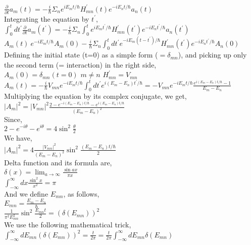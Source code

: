 \documentclass{article}
\begin{document}
\noindent $\frac{\partial}{\partial t}a_m(t)=-\frac{i}{\hbar}\Sigma_{n}e^{iE_mt/\hbar}H^{'}_{mn}(t)e^{-iE_nt/\hbar}a_n(t)$\\
\noindent Integrating the equation by $t^{'}$, \\
\noindent $\int^{t}_{0}dt^{'}\frac{\partial}{\partial t}a_m(t^{'})=-\frac{i}{\hbar}\Sigma_{n}\int^{t}_{0}e^{iE_mt^{'}/\hbar}H^{'}_{mn}(t^{'})e^{-iE_nt^{'}/\hbar}a_n(t^{'})$\\
\noindent $A_m(t)~e^{-iE_m t/\hbar}A_m(0)-\frac{i}{\hbar}\Sigma_n\int^{t}_{0}dt^{'}e^{-iE_m(t-t^{'})/\hbar}H^{'}_{mn}(t^{'})e^{-iE_n t^{'}/\hbar}A_n(0)$\\
\noindent Defining the initial state (t=0) as a simple form ($=\delta_{mn}$), and picking up only the second term (= interaction) in the right side,\\
\noindent $A_m(0)=\delta_{mn} (t=0)$ $m \neq n$ $H^{'}_{mn}=V_{mn}$\\
\noindent $A_m(t)=-\frac{i}{\hbar}V_{mn}e^{-iE_m t/\hbar}\int_0^{t}dt^{'}e^{i(E_m-E_n)t^{'}/\hbar}=-V_{mn}e^{-iE_m t/\hbar}\frac{e^{i(E_m-E_n)t/\hbar}-1}{E_m-E_n}$\\
\noindent Multiplying the equation by its complex conjugate, we get,\\
\noindent $\lvert A_m\rvert^2=\lvert V_{mn}\rvert^2\frac{2-e^{-i(E_m-E_n)t/\hbar}-e^{i(E_m-E_n)t/\hbar}}{(E_m-E_n)^2}$\\
\noindent Since,\\
\noindent $2-e^{-i\theta}-e^{i\theta}=4\sin^2\frac{\theta}{2}$\\
\noindent We have,\\
\noindent $\lvert A_m\rvert^2=4\frac{\lvert V_{mn}\rvert^2}{(E_m-E_n)^2}\sin^2\frac{(E_m-E_n)t/\hbar}{2}$\\
\noindent Delta function and its formula are,\\
\noindent $\delta(x)=\lim_{a\rightarrow\infty}\frac{\sin ax}{\pi x}$\\
\noindent $\int^{\infty}_{-\infty}dx\frac{\sin^2 x}{x^2}=\pi$\\
\noindent And we define $E_{mn}$, as follows,\\
\noindent $E_{mn}=\frac{E_m-E_n}{\hbar}$\\
\noindent $\frac{1}{\pi^2E^2_{mn}}\sin^2{\frac{E_{mn}t}{2}}=(\delta(E_{mn}))^2$\\
\noindent We use the following mathematical trick,\\
\noindent $\int^{\infty}_{-\infty}dE_{mn}(\delta(E_{mn}))^2=\frac{t}{2\pi}=\frac{t}{2\pi}\int^{\infty}_{-\infty}dE_{mn}\delta(E_{mn})$\\
\end{document}
